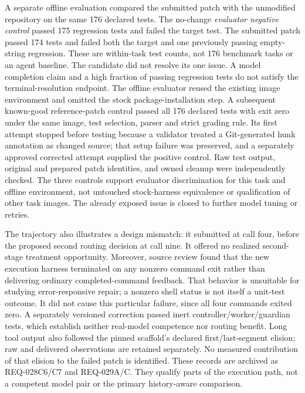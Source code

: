 A separate offline evaluation compared the submitted patch with the unmodified repository on the
same 176 declared tests. The no-change \emph{evaluator negative control} passed 175 regression tests
and failed the target test. The submitted patch passed 174 tests and failed both the target and one
previously passing empty-string regression. These are within-task test counts, not 176 benchmark tasks
or an agent baseline. The candidate did not resolve its one issue. A model completion claim and a high
fraction of passing regression tests do not satisfy the terminal-resolution endpoint.
The offline evaluator reused the existing image environment and omitted the stock package-installation
step. A subsequent known-good reference-patch control passed all 176 declared tests with exit zero
under the same image, test selection, parser and strict grading rule. Its first attempt stopped before
testing because a validator treated a Git-generated hunk annotation as changed source; that setup
failure was preserved, and a separately approved corrected attempt supplied the positive control.
Raw test output, original and prepared patch identities, and owned cleanup were independently checked.
The three controls support evaluator discrimination for this task and offline environment, not untouched
stock-harness equivalence or qualification of other task images. The already exposed issue is closed
to further model tuning or retries.

The trajectory also illustrates a design mismatch: it submitted at call four, before the proposed
second routing decision at call nine. It offered no realized second-stage treatment opportunity.
Moreover, source review found that the new execution harness terminated on any nonzero command
exit rather than delivering ordinary completed-command feedback. That behavior is unsuitable for
studying error-responsive repair; a nonzero shell status is not itself a unit-test outcome. It did not
cause this particular failure, since all four commands exited zero. A separately versioned correction
passed inert controller/worker/guardian tests, which establish neither real-model competence nor routing
benefit. Long tool output also followed the pinned scaffold's declared first/last-segment elision;
raw and delivered observations are retained separately. No measured contribution of that elision to
the failed patch is identified. These records are archived as REQ-028C6/C7 and REQ-029A/C. They qualify
parts of the execution path, not a competent model pair or the primary history-aware comparison.

